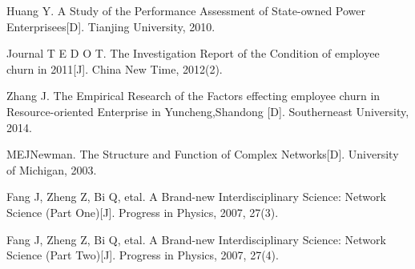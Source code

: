 \documentclass[12pt,a4paper,titlepage]{article}
\begin{document}
\begin{thebibliography}{99}

\bibitem{} Huang Y. A Study of the Performance Assessment of State-owned Power Enterprisees[D]. Tianjing University, 2010.

\bibitem{} Journal T E D O T. The Investigation Report of the Condition of employee churn in 2011[J]. China New Time, 2012(2).

\bibitem{} Zhang J. The Empirical Research of the Factors effecting employee churn in Resource-oriented Enterprise in Yuncheng,Shandong [D]. Southerneast University, 2014.

\bibitem{} MEJNewman. The Structure and Function of Complex Networks[D]. University of Michigan, 2003.

\bibitem{} Fang J, Zheng Z, Bi Q, etal. A Brand-new
  Interdisciplinary Science: Network Science (Part One)[J]. Progress in Physics, 2007, 27(3).

\bibitem{} Fang J, Zheng Z, Bi Q, etal. A Brand-new
  Interdisciplinary Science: Network Science (Part Two)[J]. Progress in Physics, 2007, 27(4).

\end{thebibliography}

\label{LastPage}
\end{document}
